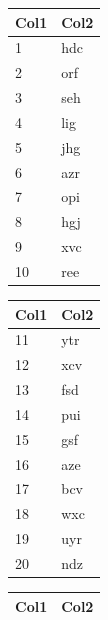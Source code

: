 \documentclass{ASD}
\begin{document}
\begin{table}[htb]
	\begin{minipage}[t]{0.19\linewidth}
		\centering
		\begin{tabular}{l l}
			\hline
			\rowcolor{DarkColor} 
			\textbf{Col1} 			& \textbf{Col2} \\ 
			\hline
			1 & hdc \\
			2 & orf \\
			3 & seh \\
			4 & lig \\
			5 & jhg \\
			6 & azr \\
			7 & opi \\
			8 & hgj \\
			9 & xvc \\
			10 & ree \\
			\hline
		\end{tabular}
	\end{minipage}
	\begin{minipage}[t]{0.19\linewidth}
		\centering
		\begin{tabular}{l l}
			\hline
			\rowcolor{DarkColor} 
			\textbf{Col1} 			& \textbf{Col2} \\ 
			\hline
			11 & ytr \\
			12 & xcv \\
			13 & fsd \\
			14 & pui \\
			15 & gsf \\
			16 & aze \\
			17 & bcv \\
			18 & wxc \\
			19 & uyr \\
			20 & ndz \\
			\hline
		\end{tabular}
	\end{minipage}
	\begin{minipage}[t]{0.19\linewidth}
		\centering
		\begin{tabular}{l l}
			\hline
			\rowcolor{DarkColor} 
			\textbf{Col1} 			& \textbf{Col2} \\ 
			\hline

\end{tabular}
\end{minipage}
\end{table}
\end{document}
